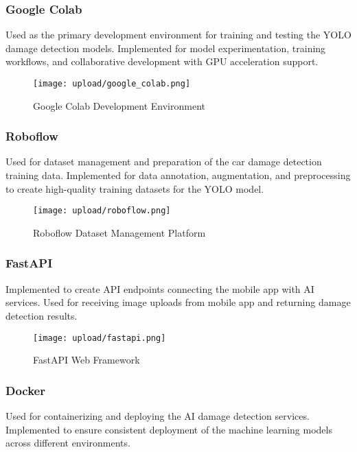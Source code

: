 \documentclass[12pt,a4paper]{report}
\begin{document}
\subsubsection{Google Colab}
Used as the primary development environment for training and testing the YOLO damage detection models. Implemented for model experimentation, training workflows, and collaborative development with GPU acceleration support.

\begin{figure}[H]
    \centering
    \texttt{[image: upload/google\_colab.png]}
    \caption{Google Colab Development Environment}
    \label{fig:google_colab}
\end{figure}

\subsubsection{Roboflow}
Used for dataset management and preparation of the car damage detection training data. Implemented for data annotation, augmentation, and preprocessing to create high-quality training datasets for the YOLO model.

\begin{figure}[H]
    \centering
    \texttt{[image: upload/roboflow.png]}
    \caption{Roboflow Dataset Management Platform}
    \label{fig:roboflow}
\end{figure}

\subsubsection{FastAPI}
Implemented to create API endpoints connecting the mobile app with AI services. Used for receiving image uploads from mobile app and returning damage detection results.

\begin{figure}[H]
    \centering
    \texttt{[image: upload/fastapi.png]}
    \caption{FastAPI Web Framework}
    \label{fig:fastapi}
\end{figure}



\subsubsection{Docker}
Used for containerizing and deploying the AI damage detection services. Implemented to ensure consistent deployment of the machine learning models across different environments.
\end{document}
